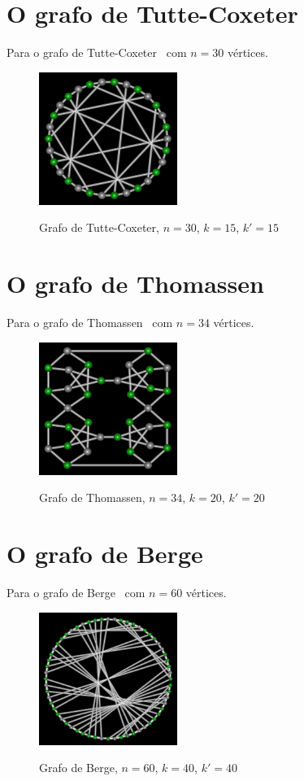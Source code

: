 \section{O grafo de Tutte-Coxeter}
Para o grafo de Tutte-Coxeter~\cite{cite:example-tutte} com $n=30$
vértices.

\begin{figure}[htb]
\centering
\includegraphics[width=0.4\textwidth]{img/tutte.png}
\label{fig:example-tutte}
\caption{Grafo de Tutte-Coxeter, $n=30$, $k=15$, $k'=15$}
\end{figure}


\section{O grafo de Thomassen}
Para o grafo de Thomassen~\cite{cite:example-thomassen} com $n=34$
vértices.

\begin{figure}[htb]
\centering
\includegraphics[width=0.4\textwidth]{img/thomassen.png}
\label{fig:example-thomassen}
\caption{Grafo de Thomassen, $n=34$, $k=20$, $k'=20$}
\end{figure}


\section{O grafo de Berge}
Para o grafo de Berge~\cite{cite:example-berge} com $n=60$ vértices.

\begin{figure}[htb]
\centering
\includegraphics[width=0.4\textwidth]{img/berge.png}
\label{fig:example-berge}
\caption{Grafo de Berge, $n=60$, $k=40$, $k'=40$}
\end{figure}


